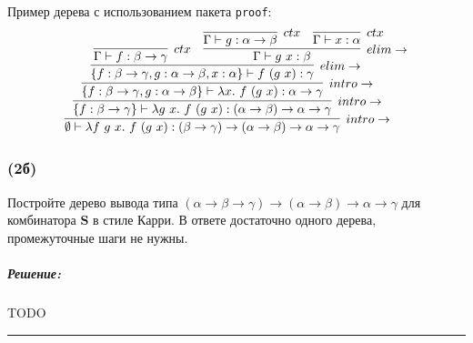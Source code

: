 \documentclass{article}
\newenvironment{proof}{\subparagraph{\hspace{-1em}Решение:\newline}}{\par\noindent\rule{\textwidth}{0.4pt}}
\newcommand{\term}[1]{\mathbf{#1}}
\begin{document}
    Пример дерева с использованием пакета \texttt{proof}:
    \[\resizebox{0.8\hsize}{!}{
        \infer[intro\to]
        {\emptyset \vdash \lambda f~g~x.~f~(g~x) : (\beta \to \gamma) \to (\alpha \to \beta) \to \alpha \to \gamma}
        {
            \infer[intro\to]
            {\{f: \beta \to \gamma\} \vdash \lambda g~x.~f~(g~x) : (\alpha \to \beta) \to \alpha \to \gamma}
            {
                \infer[intro\to]
                {\{f : \beta \to \gamma, g : \alpha \to \beta\} \vdash \lambda x.~f~(g~x) : \alpha \to \gamma}
                {
                    \infer[elim\to]{\{f : \beta \to \gamma, g : \alpha \to \beta, x:  \alpha\} \vdash f~(g~x) : \gamma}
                    {
                        \infer[ctx]{\Gamma \vdash f : \beta \to \gamma}{} &
                        \infer[elim\to]{\Gamma \vdash g~x : \beta}{
                            \infer[ctx]{\Gamma \vdash g : \alpha \to \beta}{} &
                            \infer[ctx]{\Gamma \vdash x : \alpha}{}
                        }
                    }
                }
            }
        }
    }\]

    \subsubsection{(2б)}

    Постройте дерево вывода типа $(\alpha \to \beta \to \gamma) \to (\alpha \to \beta) \to \alpha \to \gamma$ для комбинатора $\term{S}$ в стиле Карри.
    В ответе достаточно одного дерева, промежуточные шаги не нужны.

    \begin{proof}
        TODO %
    \end{proof}
\end{document}
